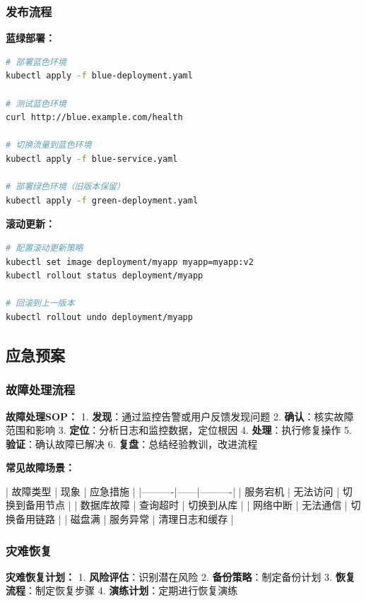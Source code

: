 \documentclass[12pt,UTF8]{ctexbook}
\begin{document}
\subsubsection*{发布流程}

\textbf{蓝绿部署：}
\begin{lstlisting}[language=bash]
# 部署蓝色环境
kubectl apply -f blue-deployment.yaml

# 测试蓝色环境
curl http://blue.example.com/health

# 切换流量到蓝色环境
kubectl apply -f blue-service.yaml

# 部署绿色环境（旧版本保留）
kubectl apply -f green-deployment.yaml
\end{lstlisting}

\textbf{滚动更新：}
\begin{lstlisting}[language=bash]
# 配置滚动更新策略
kubectl set image deployment/myapp myapp=myapp:v2
kubectl rollout status deployment/myapp

# 回滚到上一版本
kubectl rollout undo deployment/myapp
\end{lstlisting}

\subsection*{应急预案}

\subsubsection*{故障处理流程}

\textbf{故障处理SOP：}
1. \textbf{发现}：通过监控告警或用户反馈发现问题
2. \textbf{确认}：核实故障范围和影响
3. \textbf{定位}：分析日志和监控数据，定位根因
4. \textbf{处理}：执行修复操作
5. \textbf{验证}：确认故障已解决
6. \textbf{复盘}：总结经验教训，改进流程

\textbf{常见故障场景：}

| 故障类型 | 现象 | 应急措施 |
|----------|------|----------|
| 服务宕机 | 无法访问 | 切换到备用节点 |
| 数据库故障 | 查询超时 | 切换到从库 |
| 网络中断 | 无法通信 | 切换备用链路 |
| 磁盘满 | 服务异常 | 清理日志和缓存 |

\subsubsection*{灾难恢复}

\textbf{灾难恢复计划：}
1. \textbf{风险评估}：识别潜在风险
2. \textbf{备份策略}：制定备份计划
3. \textbf{恢复流程}：制定恢复步骤
4. \textbf{演练计划}：定期进行恢复演练
\end{document}
